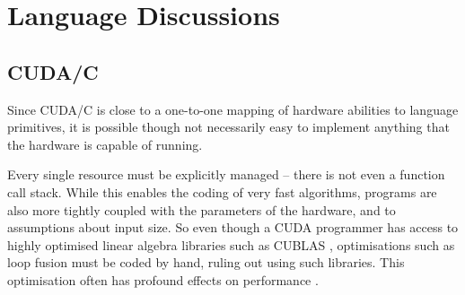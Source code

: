 


\chapter{Language Discussions}

\section{CUDA/C}

Since CUDA/C is close to a one-to-one mapping of hardware abilities to language
primitives, it is possible though not necessarily easy to implement anything
that the hardware is capable of running.

Every single resource must be explicitly managed -- there is not even a
function call stack. While this enables the coding of very fast algorithms,
programs are also more tightly coupled with the parameters of the hardware, and
to assumptions about input size. So even though a CUDA programmer has access to
highly optimised linear algebra libraries such as CUBLAS \cite{CUBLAS2013},
optimisations such as loop fusion must be coded by hand, ruling out using such
libraries. This optimisation often has profound effects on performance
\cite{mainlandhaskell}.


